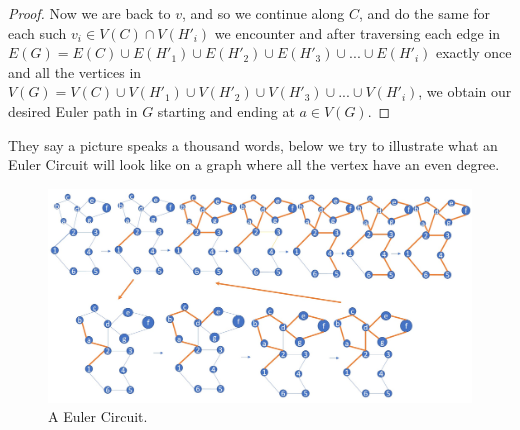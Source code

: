 \documentclass[12pt, fullpage]{article}
\begin{document}
\begin{enumerate}
\begin{proof}
 	   Now we are back to $v$, and so we continue along $C$, and do the same for each such $v_i \in V(C) \cap V(H'_i)$ we encounter and after traversing each edge in $E(G) = E(C) \cup E(H'_1)\cup E(H'_2) \cup E(H'_3)\cup... \cup E(H'_i)$ exactly once and all the vertices in $V(G) = V(C) \cup V(H'_1)\cup V(H'_2) \cup V(H'_3) \cup... \cup V(H'_i)$, we obtain our desired Euler path in $G$ starting and ending at $a \in V(G)$. 	  
\end{proof} 
 	  They say a picture speaks a thousand words, below we try to illustrate what an Euler Circuit will look like on a graph where all the vertex have an even degree.
\begin{figure}[h!]
  \includegraphics[width=\linewidth]{circuit.jpg}
  \caption{A Euler Circuit.}
\end{figure}
\end{enumerate}

\end{document}
